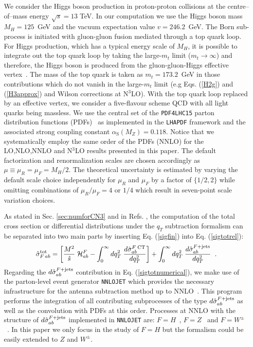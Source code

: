 \documentclass[12pt]{article}
\def\beeq{\begin{eqnarray}}
\def\eeeq{\end{eqnarray}}
\newcommand\as{\alpha_{\mathrm{S}}}
\newcommand\f[2]{\frac{#1}{#2}}
\def\qt{q_T}
\begin{document}
We consider the Higgs boson production in proton-proton collisions at the centre--of--mass energy $\sqrt{s}=13$ TeV. In our computation we use the Higgs boson mass  $M_H= 125$~GeV and the vacuum expectation value  $v=246.2$~GeV. The Born sub-process is initiated with gluon-gluon fusion mediated through a top quark loop. For Higgs production, which has a typical energy scale of $M_H$, it is possible to integrate out the top quark loop by taking the large-$m_t$ limit ($m_{t}\rightarrow \infty$) and therefore, the Higgs boson is produced from the gluon-gluon-Higgs effective vertex~\cite{Heft}. The mass of the top quark is taken as $m_t = 173.2$~GeV in those contributions which do not vanish in the large-$m_t$ limit (e.g  Eqs. (\ref{H2g}) and  (\ref{H3approx}) and Wilson corrections at N$^3$LO). With the top quark loop replaced by an effective vertex, we consider a five-flavour scheme QCD with all light quarks being massless. We use the central set of the \texttt{PDF4LHC15} parton distribution functions (PDFs)~\cite{nnpdf} as implemented in the \texttt{LHAPDF} framework \cite{Buckley:2014ana} and the associated strong coupling constant $\as(M_Z)=0.118$. Notice that we systematically employ the same order of the PDFs (NNLO) for the LO,NLO,NNLO and N$^{3}$LO results presented in this paper. The default factorization and renormalization scales are chosen accordingly as $\mu \equiv \mu_R = \mu_F =  M_H / 2$. The theoretical uncertainty is estimated by varying the default scale choice independently for $\mu_R$ and $\mu_F$ by a factor of $\{1/2,2\}$ while omitting combinations of $\mu_R/\mu_F = 4$ or $1/4$ which result in seven-point scale variation choices. 

As stated in Sec. \ref{sec:numforCN3} and in Refs. \cite{Catani:2007vq,Bozzi:2005wk}, the computation of the total cross section or differential distributions under the  $\qt$ subtraction formalism can be separated into two main parts by inserting Eq. (\ref{sigfin}) into Eq. (\ref{sigtotrel}):
\beeq
\label{sigtotnumerical} 
{\hat \sigma}_{F \,ab}^{{\rm {tot}}}
 = \left[\f{M^2}{\hat s} \;{\cal H}_{ab}^F - \int_0^{\infty} dq_T^2 \;
   \f{d{\hat \sigma}_{ab}^{F\;{\rm CT}}}{d q_T^2}\right]
+ \int_0^{\infty} dq_T^2 \;\f{d{\hat \sigma}_{ab}^{F+{\rm jets}}}{d q_T^2} \;\;.
\eeeq
Regarding the $d{\hat \sigma}_{ab}^{F+{\rm jets}}$ contribution in Eq. (\ref{sigtotnumerical}), we make use of the parton-level event generator \texttt{NNLOJET} which provides the necessary infrastructure for the antenna subtraction method up to NNLO~\cite{Antenna:method}. This program performs the integration of all contributing subprocesses of the type  $d{\hat \sigma}_{ab}^{F+{\rm jets}}$ as well as the convolution with PDFs at this order. Processes at NNLO with the structure of $d{\hat \sigma}_{ab}^{F+{\rm jets}}$ implemented in \texttt{NNLOJET} are: $F=H$~\cite{Chen:2014gva,Chen:2016zka}, $F=Z$~\cite{Ridder:2015dxa,Gehrmann-DeRidder:2016jns,Gehrmann-DeRidder:2017mvr} and $F=W^{\pm}$~\cite{Gehrmann-DeRidder:2017mvr}. In this paper we only focus in the study of $F=H$ but the formalism could be easily extended  to $Z$ and $W^{\pm}$. 
\end{document}
